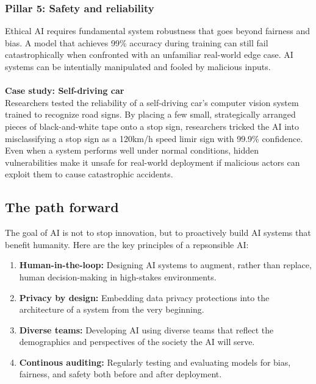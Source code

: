 \documentclass[11pt]{article}
\begin{document}
\subsubsection{Pillar 5: Safety and reliability}
Ethical AI requires fundamental system robustness that goes beyond fairness and bias. 
A model that achieves 99\% accuracy during training can still fail catastrophically when confronted with an unfamiliar real-world edge case.
AI systems can be intentially manipulated and fooled by malicious inputs.
\\\\
\textbf{Case study: Self-driving car}\\
Researchers tested the reliability of a self-driving car's computer vision system trained to recognize road signs.
By placing a few small, strategically arranged pieces of black-and-white tape onto a stop sign, researchers tricked the AI into misclassifying a stop sign as a 120km/h speed limir sign with 99.9\% confidence.
Even when a system performs well under normal conditions, hidden vulnerabilities make it unsafe for real-world deployment if malicious actors can exploit them to cause catastrophic accidents.

\subsection{The path forward}
The goal of AI is not to stop innovation, but to proactively build AI systems that benefit humanity. Here are the key principles of a repsonsible AI:
\begin{enumerate}
    \item \textbf{Human-in-the-loop:} Designing AI systems to augment, rather than replace, human decision-making in high-stakes environments.
    \item \textbf{Privacy by design:} Embedding data privacy protections into the architecture of a system from the very beginning.
    \item \textbf{Diverse teams:} Developing AI using diverse teams that reflect the demographics and perspectives of the society the AI will serve.
    \item \textbf{Continous auditing:} Regularly testing and evaluating models for bias, fairness, and safety both before and after deployment.
\end{enumerate}
\end{document}
